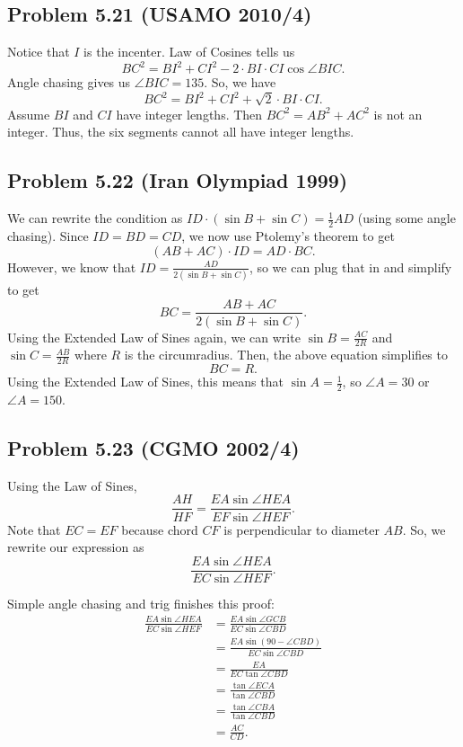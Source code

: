 \documentclass{scrartcl}
\begin{document}
\subsection*{Problem 5.21 (USAMO 2010/4)}
Notice that $I$ is the incenter.
Law of Cosines tells us
\[
    BC^2 = BI^2 + CI^2 - 2 \cdot BI \cdot CI \cos \angle BIC.
\]
Angle chasing gives us $\angle BIC = 135$. So, we have
\[
    BC^2 = BI^2 + CI^2 + \sqrt{2} \cdot BI \cdot CI.
\]
Assume $BI$ and $CI$ have integer lengths. Then $BC^2 = AB^2 + AC^2$ is not an integer. Thus, the six segments cannot all have integer lengths.
\subsection*{Problem 5.22 (Iran Olympiad 1999)}
We can rewrite the condition as $ID \cdot (\sin B + \sin C) = \frac{1}{2} AD$ (using some angle chasing). Since $ID = BD = CD$, we now use Ptolemy's theorem to get
\[
    (AB + AC) \cdot ID = AD \cdot BC.
\]
However, we know that $ID = \frac{AD}{2(\sin B + \sin C)}$, so we can plug that in and simplify to get
\[
    BC = \frac{AB + AC}{2(\sin B + \sin C)}.
\]
Using the Extended Law of Sines again, we can write $\sin B = \frac{AC}{2R}$ and $\sin C = \frac{AB}{2R}$ where $R$ is the circumradius. Then, the above equation simplifies to
\[
    BC = R.
\]
Using the Extended Law of Sines, this means that $\sin A = \frac{1}{2}$, so $\angle A = 30$ or $\angle A = 150$.
\subsection*{Problem 5.23 (CGMO 2002/4)}
Using the Law of Sines,
\[
    \frac{AH}{HF} = \frac{EA \sin \angle HEA}{EF \sin \angle HEF}.
\]
Note that $EC = EF$ because chord $CF$ is perpendicular to diameter $AB$. So, we rewrite our expression as
\[
    \frac{EA \sin \angle HEA}{EC \sin \angle HEF}.
\]

Simple angle chasing and trig finishes this proof:
\begin{align*}
    \frac{EA \sin \angle HEA}{EC \sin \angle HEF} &= \frac{EA \sin \angle GCB}{EC \sin \angle CBD} \\
    &= \frac{EA \sin (90 - \angle CBD)}{EC \sin \angle CBD} \\
    &= \frac{EA}{EC \tan \angle CBD} \\
    &= \frac{\tan \angle ECA}{\tan \angle CBD} \\
    &= \frac{\tan \angle CBA}{\tan \angle CBD} \\
    &= \frac{AC}{CD}.
\end{align*}
\end{document}
